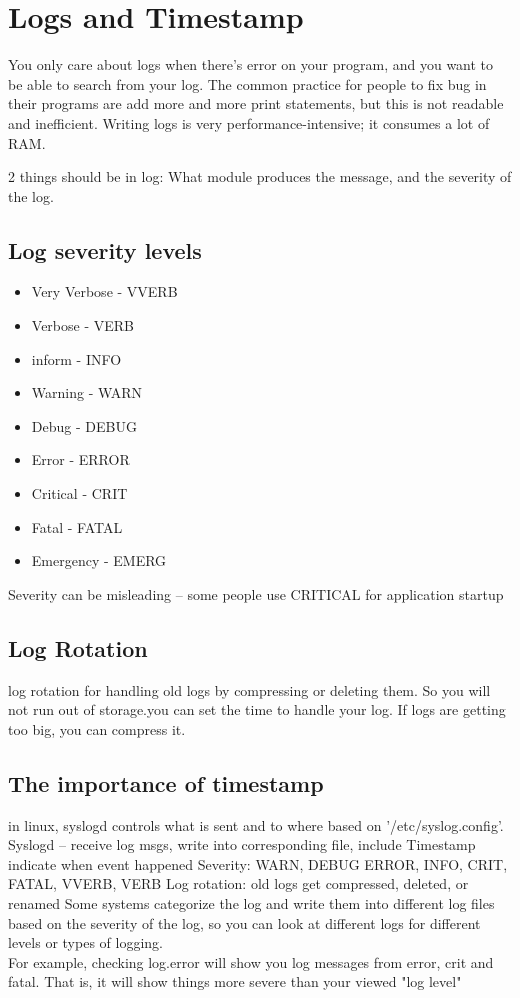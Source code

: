 \documentclass[fancy,11pt,titlestyle=display]{style/elegantbook}
\begin{document}
\chapter{Logs and Timestamp}

You only care about logs when there's error on your program, and you want to be able to search from your log.
The common practice for people to fix bug in their programs are add more and more print statements,
but this is not readable and inefficient.
Writing logs is very performance-intensive; it consumes a lot of RAM.

2 things should be in log: What module produces the message, and the severity of the log.

\section{ Log severity levels}
\begin{itemize}
    \item Very Verbose - VVERB
    \item Verbose - VERB
    \item inform - INFO
    \item Warning - WARN
    \item Debug - DEBUG
    \item Error - ERROR
    \item Critical - CRIT
    \item Fatal - FATAL
    \item Emergency - EMERG
\end{itemize}

\begin{note}
Severity can be misleading -- some people use CRITICAL for application startup
\end{note}

\section{Log Rotation}
\noindent log rotation for handling old logs by compressing or deleting them. So you will not run out of storage.you can set the time to handle your log. If logs are getting too big, you can compress it.\\

\section{The importance of timestamp}

in linux, syslogd controls what is sent and to where based on '/etc/syslog.config'.
Syslogd – receive log msgs, write into corresponding file, include Timestamp indicate when event happened
Severity: WARN, DEBUG ERROR, INFO, CRIT, FATAL, VVERB, VERB
Log rotation: old logs get compressed, deleted, or renamed
Some systems categorize the log and write them into different log files based on the severity of the log,
so you can look at different logs for different levels or types of logging.\\
For example, checking log.error will show you log messages from error, crit and fatal.
That is, it will show things more severe than your viewed "log level"\\
\end{document}
